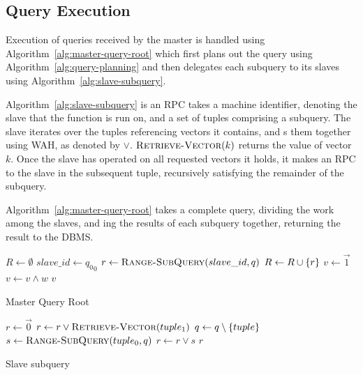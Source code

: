 \subsection{Query Execution}
Execution of queries received by the master is handled using
Algorithm~\ref{alg:master-query-root} which first plans out the query using
Algorithm~\ref{alg:query-planning} and then delegates each subquery to its slaves using
Algorithm~\ref{alg:slave-subquery}.\par
Algorithm~\ref{alg:slave-subquery} is an RPC takes a machine identifier, denoting
the slave that the function is run on, and a set of tuples comprising a subquery.
The slave iterates over the tuples referencing vectors it contains, and s
them together using WAH, as denoted by \(\lor\). \(\textsc{Retrieve-Vector}(k)\) returns
the value of vector $k$. Once the slave has operated on all
requested vectors it holds, it makes an RPC to the slave in the subsequent tuple,
recursively satisfying the remainder of the subquery.\par
Algorithm~\ref{alg:master-query-root} takes a complete query, dividing the work
among the slaves, and ing the results of each subquery together,
returning the result to the DBMS.
%
\begin{algorithm}
    \begin{algorithmic}
            \State $R \gets \emptyset$
                \State $slave\_id \gets {q_0}_0$
                \State $r \gets \Call{Range-SubQuery}{slave\_id, q}$
                \State $R \gets R \cup \left\{r\right\}$
            \EndFor
            \State $v \gets \vec{1}$
                \State $v \gets v \land w$
            \EndFor
            \State \Return $v$
        \EndProcedure
    \end{algorithmic}
    \caption{Master Query Root}
    \label{alg:master-query-root}
\end{algorithm}
%
\begin{algorithm}
    \begin{algorithmic}
            \State $r \gets \vec{0}$
                    \State $r \gets r \lor \Call{Retrieve-Vector}{tuple_1}$
                    \State $q \gets q \setminus \left\{tuple\right\}$
                \Else
                    \State $s \gets \Call{Range-SubQuery}{tuple_0, q}$
                    \State $r \gets r \lor s$
                \EndIf
            \EndFor
            \State \Return $r$
        \EndProcedure
    \end{algorithmic}
    \caption{Slave subquery}
    \label{alg:slave-subquery}
\end{algorithm}
%
